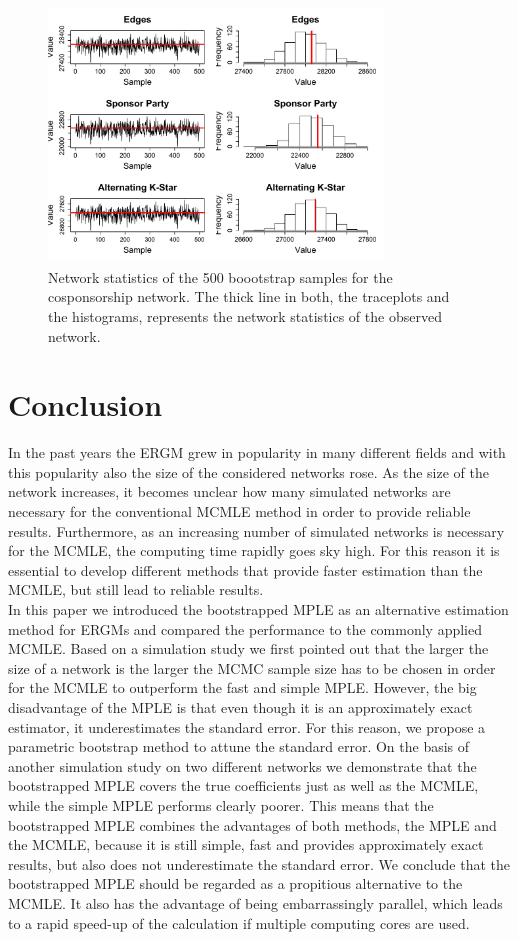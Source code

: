 \documentclass[10pt, conference, compsocconf]{IEEEtran}
\begin{document}
\begin{figure}[!t]
\centering
\includegraphics[width=3.5in, height=2.7in]{MPLE_histogram_traceplot_cosponsorship}
\caption{Network statistics of the 500 boootstrap samples for the cosponsorship network. The thick line in both, the traceplots and the histograms, represents the network statistics of the observed network. }
\label{diagnostics}
\end{figure}

\section{Conclusion}
\noindent In the past years the ERGM grew in popularity in many different fields and with this popularity also the size of the considered networks rose. As the size of the network increases, it becomes unclear how many simulated networks are necessary for the conventional MCMLE method in order to provide reliable results. Furthermore, as an increasing number of simulated networks is necessary for the MCMLE, the computing time rapidly goes sky high. For this reason it is essential to develop different methods that provide faster estimation than the MCMLE, but still lead to reliable results.\\
In this paper we introduced the bootstrapped MPLE as an alternative estimation method for ERGMs and compared the performance to the commonly applied MCMLE. Based on a simulation study we first pointed out that the larger the size of a network is the larger the MCMC sample size has to be chosen in order for the MCMLE to outperform the fast and simple MPLE. However, the big disadvantage of the MPLE is that even though it is an approximately exact estimator, it underestimates the standard error. For this reason, we propose a parametric bootstrap method to attune the standard error. On the basis of another simulation study on two different networks we demonstrate that the bootstrapped MPLE covers the true coefficients just as well as the MCMLE, while the simple MPLE performs clearly poorer. This means that the bootstrapped MPLE combines the advantages of both methods, the MPLE and the MCMLE, because it is still simple, fast and provides approximately exact results, but also does not underestimate the standard error. We conclude that the bootstrapped MPLE should be regarded as a propitious alternative to the MCMLE. It also has the advantage of being embarrassingly parallel, which leads to a rapid speed-up of the calculation if multiple computing cores are used.
\end{document}
